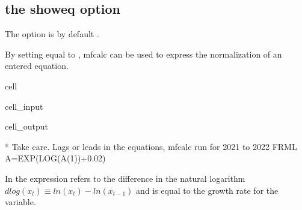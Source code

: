 \documentclass[letterpaper,10pt,english]{jupyterBook}
\begin{document}
\subsection{ \sphinxhyphen{} the showeq option}
\label{\detokenize{content/04_PythonEssentials/mfcalc:mfcalc-the-showeq-option}}
\sphinxAtStartPar
The  option is by default .

\sphinxAtStartPar
By setting equal to , mfcalc can be used to express the normalization of an entered equation.

\begin{sphinxuseclass}{cell}\begin{sphinxVerbatimInput}

\begin{sphinxuseclass}{cell_input}
\begin{sphinxVerbatim}[commandchars=\\\{\}]
\end{sphinxVerbatim}

\end{sphinxuseclass}\end{sphinxVerbatimInput}
\begin{sphinxVerbatimOutput}

\begin{sphinxuseclass}{cell_output}
\begin{sphinxVerbatim}[commandchars=\\\{\}]
* Take care. Lags or leads in the equations, mfcalc run for 2021 to 2022
FRML \PYGZlt{}\PYGZgt{} A=EXP(LOG(A(\PYGZhy{}1))+0.02)\PYGZdl{}
\end{sphinxVerbatim}

\end{sphinxuseclass}\end{sphinxVerbatimOutput}

\end{sphinxuseclass}
\sphinxAtStartPar
In  the expression  refers to the difference in the natural logarithm \(dlog(x_t) \equiv ln(x_t)-ln(x_{t-1})\) and is equal to the growth rate for the variable.
\end{document}
